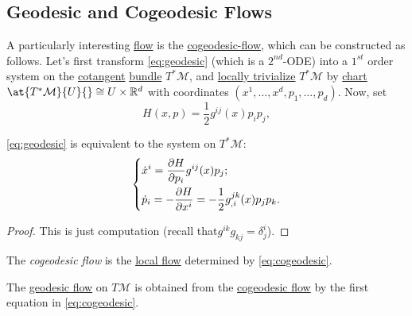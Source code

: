 \subsection{Geodesic and Cogeodesic Flows}
A particularly interesting \hyperref[def:local-flow]{flow} is the \hyperref[def:cogeodesic-flow]{cogeodesic-flow}, which can be constructed as follows. Let's first transform \autoref{eq:geodesic} (which is a \(2^{nd}\)-ODE) into a \(1^{st} \) order system on the \hyperref[def:cotangent-space]{cotangent} \hyperref[def:vector-bundle]{bundle} \(T^{\ast} \mathcal{M} \), and \hyperref[def:local-trivialization]{locally trivialize} \(T^{\ast} \mathcal{M} \) by \hyperref[def:coordinate-chart]{chart} \(\at{T^{\ast} \mathcal{M} }{U}{} \cong U \times \mathbb{R} ^d\) with coordinates \((x^1, \dots , x^d, p_1, \dots , p_d)\). Now, set
\begin{equation}\label{eq:Hamilton}
	H(x, p) = \frac{1}{2} g^{ij} (x) p_i p_j,
\end{equation}

\begin{theorem}
	\autoref{eq:geodesic} is equivalent to the system on \(T^{\ast} \mathcal{M} \):
	\begin{equation}\label{eq:cogeodesic}
		\begin{dcases}
			\dot{x}^i = \frac{\partial H}{\partial p_i} g^{ij}(x) p_j; \\
			\dot{p}_i = -\frac{\partial H}{\partial x^i} = -\frac{1}{2} g^{jk}_{, i}(x)p_j p_k.
		\end{dcases}
	\end{equation}
\end{theorem}
\begin{proof}
	This is just computation (recall that\(g^{ik} g_{kj} = \delta ^i_j \)).
\end{proof}

\begin{definition}\label{def:cogeodesic-flow}
	The \emph{cogeodesic flow} is the \hyperref[def:local-flow]{local flow} determined by \autoref{eq:cogeodesic}.
\end{definition}

\begin{definition}\label{def:geodesic-flow}
	The \hyperref[def:geodesic-flow]{geodesic flow} on \(T\mathcal{M} \) is obtained from the \hyperref[def:cogeodesic-flow]{cogeodesic flow} by the first equation in \autoref{eq:cogeodesic}.
\end{definition}


